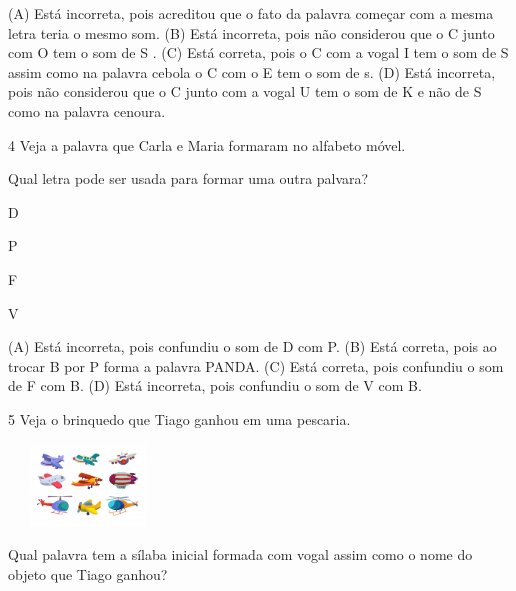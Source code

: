 (A) Está incorreta, pois acreditou que o fato da palavra começar com a mesma letra teria o mesmo som.
(B) Está incorreta, pois não considerou que o C junto com O tem o som de S .
(C) Está correta, pois o C com a vogal I tem o som de S assim como na palavra cebola o C com o E tem o som de s.
(D) Está incorreta, pois não considerou que o C junto com a vogal U tem o som de K e não de S como na palavra cenoura.

\num{4} Veja a palavra que Carla e Maria formaram no alfabeto móvel.

Qual letra pode ser usada para formar uma outra palvara?

\begin{minipage}{.5\textwidth}
\begin{escolha}
\item D

\item P

\item F

\item V
\end{escolha}
\end{minipage}

(A) Está incorreta, pois confundiu o som de D com P.
(B) Está correta, pois ao trocar B por P forma a palavra PANDA.
(C) Está correta, pois confundiu o som de F com B.
(D) Está incorreta, pois confundiu o som de V com B.

\num{5} Veja o brinquedo que Tiago ganhou em uma pescaria.

\includegraphics[width=1.69097in,height=0.86538in]{media/image177.jpeg}


Qual palavra tem a sílaba inicial formada com vogal assim como o nome do
objeto que Tiago ganhou?

